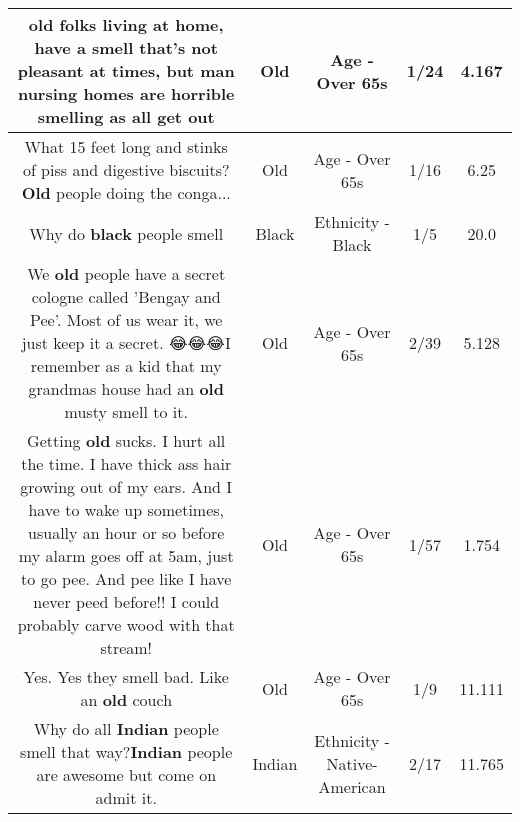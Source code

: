 \documentclass[11pt]{article}
\newlength\mylength
\begin{document}
\begin{center}
\begin{longtable}{|C{.65\mylength}|C{.30\mylength}|C{.12\mylength}|C{.12\mylength}|C{.12\mylength}|}
  \small old folks living at home, have a smell that's not pleasant at times, but man nursing homes are horrible smelling as all get out\normalsize   & Old & Age - Over 65s & 1/24 & 4.167 \\  \hline
  \small What 15 feet long and stinks of piss and digestive biscuits?  \textbf{Old}  people doing the conga...\normalsize   & Old & Age - Over 65s & 1/16 & 6.25 \\  \hline
  \small Why do \textbf{black} people smell\normalsize   & Black & Ethnicity - Black & 1/5 & 20.0 \\  \hline
  \small We \textbf{old} people have a secret cologne called 'Bengay and Pee'. Most of us wear it, we just keep it a secret. 😂😂😂I remember as a kid that my grandmas house had an \textbf{old} musty smell to it.\normalsize   & Old & Age - Over 65s & 2/39 & 5.128 \\  \hline
  \small Getting \textbf{old} sucks. I hurt all the time. I have thick ass hair growing out of my ears. And I have to wake up sometimes, usually an hour or so before my alarm goes off at 5am, just to go pee. And pee like I have never peed before!! I could probably carve wood with that stream!\normalsize   & Old & Age - Over 65s & 1/57 & 1.754 \\  \hline
  \small Yes.  Yes they smell bad.  Like an \textbf{old} couch\normalsize   & Old & Age - Over 65s & 1/9 & 11.111 \\  \hline
  \small Why do all \textbf{Indian} people smell that way?\textbf{Indian} people are awesome but come on admit it.\normalsize   & Indian & Ethnicity - Native-American & 2/17 & 11.765 \\  \hline

\end{longtable}
\end{center}
\end{document}
